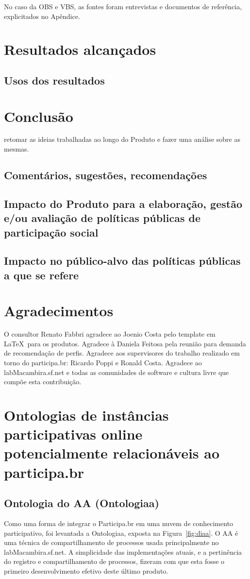 \documentclass[12pt]{article}
\begin{document}
No caso da OBS e VBS, as fontes foram entrevistas e documentos de referência, explicitados no Apêndice.

\section{Resultados alcançados}
\subsection{Usos dos resultados}\label{sec:uso}
\section{Conclusão}
retomar as ideias trabalhadas ao longo do Produto e fazer uma análise sobre as mesmas.
\subsection{Comentários, sugestões, recomendações}
\subsection{Impacto do Produto para a elaboração, gestão e/ou avaliação de políticas públicas de participação social}
\subsection{Impacto no público-alvo das políticas públicas a que se refere}
\section{Agradecimentos}
O consultor Renato Fabbri agradece ao Joenio Costa pelo template em \LaTeX\ para os produtos. Agradece à Daniela Feitosa pela reunião para demanda de recomendação de perfis. Agradece aos supervisores do trabalho realizado em torno do participa.br: Ricardo Poppi e Ronald Costa. Agradece ao labMacambira.sf.net e todas as comunidades de software e cultura livre que compõe esta contribuição.
\newpage

\newpage

\newpage
\printindex
\newpage
%
\appendix
\section{Ontologias de instâncias participativas online potencialmente relacionáveis ao participa.br}
\subsection{Ontologia do AA (Ontologiaa)}\label{ap:aa}
Como uma forma de integrar o Participa.br em uma nuvem de conhecimento participativo, foi levantada a Ontologiaa, exposta na Figura~\ref{fig:diaa}. O AA é uma técnica de compartilhamento de processos usada principalmente no labMacambira.sf.net. A simplicidade das implementações atuais, e a pertinência do registro e compartilhamento de processos, fizeram com que esta fosse o primeiro desenvolvimento efetivo deste último produto.
\end{document}
